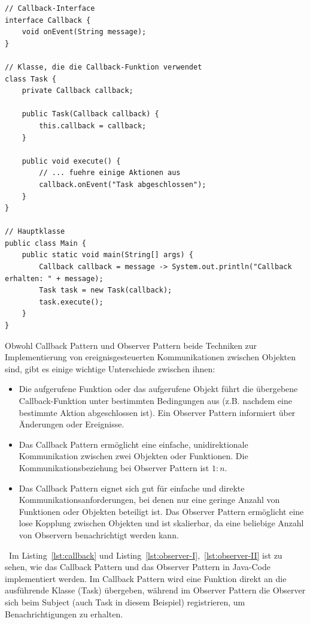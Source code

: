 \documentclass[../vs-script-first-v01.tex]{subfiles}
\begin{document}
\noindent\begin{minipage}{\textwidth}
\begin{lstlisting}[caption={Callback Pattern},captionpos=b,label={lst:callback}]
// Callback-Interface
interface Callback {
    void onEvent(String message);
}

// Klasse, die die Callback-Funktion verwendet
class Task {
    private Callback callback;

    public Task(Callback callback) {
        this.callback = callback;
    }

    public void execute() {
        // ... fuehre einige Aktionen aus
        callback.onEvent("Task abgeschlossen");
    }
}

// Hauptklasse
public class Main {
    public static void main(String[] args) {
        Callback callback = message -> System.out.println("Callback erhalten: " + message);
        Task task = new Task(callback);
        task.execute();
    }
}
\end{lstlisting}
\end{minipage}

Obwohl Callback Pattern und Observer Pattern beide Techniken zur Implementierung von ereignisgesteuerten Kommunikationen zwischen Objekten sind, gibt es einige wichtige Unterschiede zwischen ihnen:

\begin{itemize}
\item Die aufgerufene Funktion oder das aufgerufene Objekt führt die übergebene Callback-Funktion unter bestimmten Bedingungen aus (z.B. nachdem eine bestimmte Aktion abgeschlossen ist). Ein Observer Pattern informiert über Änderungen oder Ereignisse.
\item Das Callback Pattern ermöglicht eine einfache, unidirektionale Kommunikation zwischen zwei Objekten oder Funktionen. Die Kommunikationsbeziehung bei Observer Pattern ist $1:n$. 
\item Das Callback Pattern eignet sich gut für einfache und direkte Kommunikationsanforderungen, bei denen nur eine geringe Anzahl von Funktionen oder Objekten beteiligt ist. Das Observer Pattern ermöglicht eine lose Kopplung zwischen Objekten und ist skalierbar, da eine beliebige Anzahl von Observern benachrichtigt werden kann.
\end{itemize}\
Im Listing~\ref{lst:callback} und Listing~\ref{lst:observer-I},~\ref{lst:observer-II} ist zu sehen, wie das Callback Pattern und das Observer Pattern in Java-Code implementiert werden. Im Callback Pattern wird eine Funktion direkt an die ausführende Klasse (Task) übergeben, während im Observer Pattern die Observer sich beim Subject (auch Task in diesem Beispiel) registrieren, um Benachrichtigungen zu erhalten.
\end{document}
